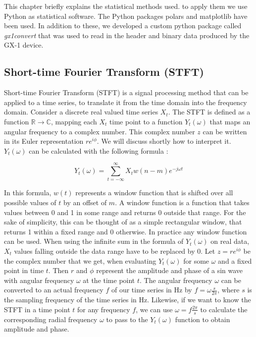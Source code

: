 \documentclass[12 pt]{scrartcl}
\begin{document}
This chapter briefly explains the statistical methods used. to apply them we use Python \citep{python} as statistical software. The Python packages polars \citep{polars} and matplotlib \citep{matplotlib} have been used. In addition to these, we developed a custom python package called \emph{gx1convert} \citep{gx1convert} that was used to read in the header and binary data produced by the GX-1 device.

\subsection{Short-time Fourier Transform (STFT)}

Short-time Fourier Transform (STFT) is a signal processing method that can be applied to a time series, to translate it from the time domain into the frequency domain. Consider a discrete real valued time series $X_t$. The STFT is defined as a function $\mathbb{R} \rightarrow \mathbb{C}$, mapping each $X_t$ time point to a function $Y_t(\omega)$ that maps an angular frequency to a complex number. This complex number $z$ can be written in its Euler representation $r e^{i \phi}$. We will discuss shortly how to interpret it. $Y_t(\omega)$ can be calculated with the following formula \citep{SASPWEB2011}:

\[ Y_t(\omega) = \sum_{t=-\infty}^{\infty}{X_t w(n-m) e^{-j \omega t}}  \]

In this formula, $w(t)$ represents a window function that is shifted over all possible values of $t$ by an offset of $m$. A window function is a function that takes values between 0 and 1 in some range and returns 0 outside that range. For the sake of simplicity, this can be thought of as a simple rectangular window, that returns 1 within a fixed range and 0 otherwise. In practice any window function can be used. When using the infinite sum in the formula of $Y_t(\omega)$ on real data, $X_t$ values falling outside the data range have to be replaced by 0. Let $z = r e^{i \phi}$ be the complex number that we get, when evaluating $Y_t(\omega)$ for some $\omega$ and a fixed point in time $t$. Then $r$ and $\phi$ represent the amplitude and phase of a sin wave with angular frequency $\omega$ at the time point $t$. The angular frequency $\omega$ can be converted to an actual frequency $f$ of our time series in Hz by $f = \omega \frac{s}{2 \pi}$, where $s$ is the sampling frequency of the time series in Hz. Likewise, if we want to know the STFT in a time point $t$ for any frequency $f$, we can use $\omega = f \frac{2 \pi}{s}$ to calculate the corresponding radial frequency $\omega$ to pass to the $Y_t(\omega)$ function to obtain amplitude and phase.
\end{document}

